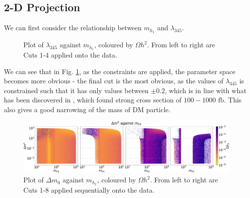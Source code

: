 \documentclass[12pt]{article}
\begin{document}
\subsection{2-D Projection}
\label{sec:2D-proj}
We can first consider the relationship between $m_{h_1}$ and $\lambda_{345}$. 
\newpage
\begin{figure}
    \centering
    \caption{Plot of $\lambda_{345}$ against $m_{h_1}$, coloured by $\Omega h^2$. From left to right are Cuts 1-4 applied onto the data.}
    \label{fig:l345_md1_main}
\end{figure}
\newpage
We can see that in Fig. \ref{fig:l345_md1_main}, as the constraints are applied, the parameter space becomes more obvious - the final cut is the most obvious, as the values of $\lambda_{345}$ is constrained such that it has only values between $\pm 0.2$, which is in line with what has been discovered in \cite{Belyaev:2018ext}, which found strong cross section of $100 - 1000 \text{ fb}$. This also gives a good narrowing of the mass of DM particle.

\begin{figure}[ht]
    \centering
    \includegraphics[width=\linewidth]{4plot/DM2_MD1.pdf}
    \caption{Plot of $\Delta m_0$ against $m_{h_1}$, coloured by $\Omega h^2$. From left to right are Cuts 1-8 applied sequentially onto the data.}
    \label{fig:DM2_md1_main}
\end{figure}
\end{document}
